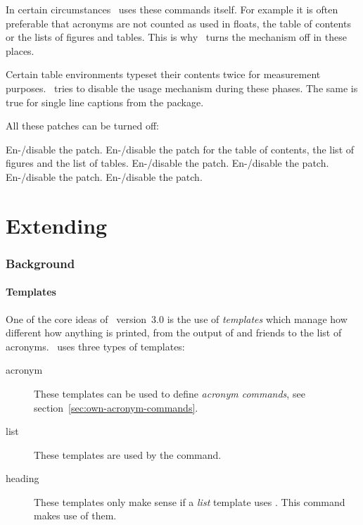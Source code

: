 \documentclass{acro-manual}
\begin{document}
In certain circumstances \acro\ uses these commands itself. For example it is
often preferable that acronyms are not counted as used in floats, the table of
contents or the lists of figures and tables.  This is why \acro\ turns the
mechanism off in these places.

Certain table environments typeset their contents twice for measurement
purposes.  \acro\ tries to disable the usage mechanism during these phases.
The same is true for single line captions from the  package.

All these patches can be turned off:
\begin{options}
    En-/disable the  patch.
    En-/disable the  patch for the table of contents, the list
    of figures and the list of tables.
    En-/disable the  patch.
    En-/disable the  patch.
    En-/disable the  patch.
    En-/disable the  patch.
\end{options}

\part{Extending \acro}\label{part:extending-acro}
\section{Background}\label{sec:background}
\subsection{Templates}
One of the core ideas of \acro\ version~3.0 is the use of \emph{templates}
which manage how different how anything is printed, from the output of 
and friends to the list of acronyms.  \acro\ uses three types of templates:
\begin{description}
  \item[acronym] These templates can be used to define \emph{acronym
      commands}, see section~\vref{sec:own-acronym-commands}.
  \item[list] These templates are used by the  command.
  \item[heading]  These templates only make sense if a \emph{list} template
    uses .  This command makes use of them.
\end{description}
\end{document}
